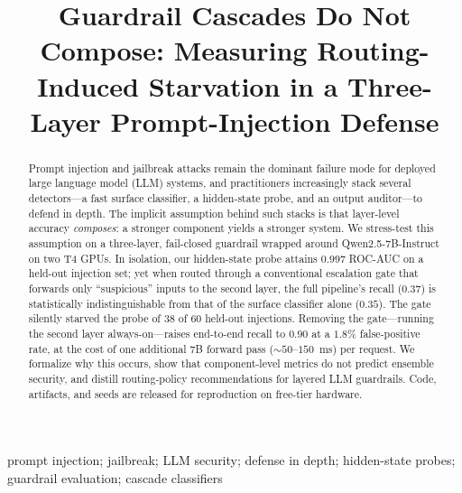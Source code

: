 \documentclass[conference]{IEEEtran}
\begin{document}
\title{Guardrail Cascades Do Not Compose: Measuring Routing-Induced Starvation in a Three-Layer Prompt-Injection Defense}

\author{
}

\maketitle

\begin{abstract}
Prompt injection and jailbreak attacks remain the dominant failure mode for
deployed large language model (LLM) systems, and practitioners increasingly
stack several detectors---a fast surface classifier, a hidden-state probe, and
an output auditor---to defend in depth. The implicit assumption behind such
stacks is that layer-level accuracy \emph{composes}: a stronger component
yields a stronger system. We stress-test this assumption on a three-layer,
fail-closed guardrail wrapped around Qwen2.5-7B-Instruct on two T4 GPUs. In
isolation, our hidden-state probe attains $0.997$ ROC-AUC on a held-out
injection set; yet when routed through a conventional escalation gate that
forwards only ``suspicious'' inputs to the second layer, the full pipeline's
recall ($0.37$) is statistically indistinguishable from that of the surface
classifier alone ($0.35$). The gate silently starved the probe of $38$ of
$60$ held-out injections. Removing the gate---running the second layer
always-on---raises end-to-end recall to $0.90$ at a $1.8\%$ false-positive
rate, at the cost of one additional 7B forward pass (${\sim}50$--$150$~ms) per
request. We formalize why this occurs, show that component-level metrics do not
predict ensemble security, and distill routing-policy recommendations for
layered LLM guardrails. Code, artifacts, and seeds are released for
reproduction on free-tier hardware.
\end{abstract}

\begin{IEEEkeywords}
prompt injection; jailbreak; LLM security; defense in depth; hidden-state
probes; guardrail evaluation; cascade classifiers
\end{IEEEkeywords}
\end{document}
